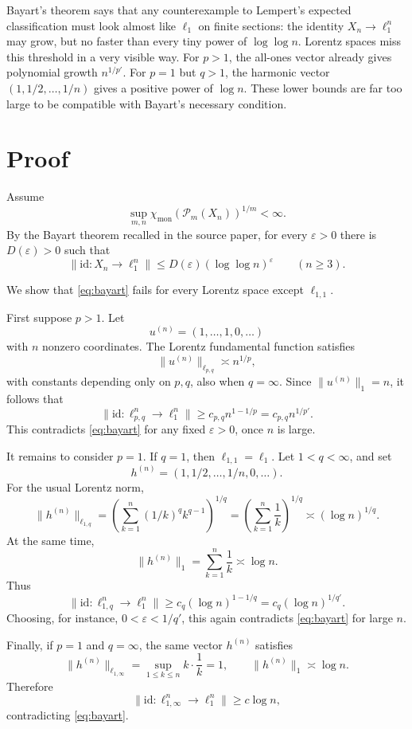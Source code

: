 \documentclass[11pt]{article}
\newcommand{\ellone}{\ell_1}
\newcommand{\chimon}{\chi_{\mathrm{mon}}}
\newcommand{\Pm}{\mathcal P_m}
\newcommand{\id}{\mathrm{id}}
\begin{document}
Bayart's theorem says that any counterexample to Lempert's expected
classification must look almost like \(\ellone\) on finite sections: the
identity \(X_n\to\ell_1^n\) may grow, but no faster than every tiny power of
\(\log\log n\).  Lorentz spaces miss this threshold in a very visible way.
For \(p>1\), the all-ones vector already gives polynomial growth
\(n^{1/p'}\).  For \(p=1\) but \(q>1\), the harmonic vector
\((1,1/2,\ldots,1/n)\) gives a positive power of \(\log n\).  These lower
bounds are far too large to be compatible with Bayart's necessary condition.

\section*{Proof}

Assume
\[
  \sup_{m,n}\chimon(\Pm(X_n))^{1/m}<\infty.
\]
By the Bayart theorem recalled in the source paper, for every
\(\varepsilon>0\) there is \(D(\varepsilon)>0\) such that
\begin{equation}\label{eq:bayart}
  \|\id:X_n\to \ell_1^n\|
  \le D(\varepsilon)(\log\log n)^\varepsilon
  \qquad(n\ge 3).
\end{equation}

We show that \eqref{eq:bayart} fails for every Lorentz space except
\(\ell_{1,1}\).

First suppose \(p>1\).  Let
\[
  u^{(n)}=(1,\ldots,1,0,\ldots)
\]
with \(n\) nonzero coordinates.  The Lorentz fundamental function satisfies
\[
  \|u^{(n)}\|_{\ell_{p,q}}\asymp n^{1/p},
\]
with constants depending only on \(p,q\), also when \(q=\infty\).  Since
\(\|u^{(n)}\|_1=n\), it follows that
\[
  \|\id:\ell_{p,q}^n\to\ell_1^n\|
  \ge c_{p,q} n^{1-1/p}
  = c_{p,q} n^{1/p'}.
\]
This contradicts \eqref{eq:bayart} for any fixed
\(\varepsilon>0\), once \(n\) is large.

It remains to consider \(p=1\).  If \(q=1\), then
\(\ell_{1,1}=\ellone\).  Let \(1<q<\infty\), and set
\[
  h^{(n)}=(1,1/2,\ldots,1/n,0,\ldots).
\]
For the usual Lorentz norm,
\[
  \|h^{(n)}\|_{\ell_{1,q}}
  =
  \left(\sum_{k=1}^n (1/k)^q k^{q-1}\right)^{1/q}
  =
  \left(\sum_{k=1}^n \frac1k\right)^{1/q}
  \asymp (\log n)^{1/q}.
\]
At the same time,
\[
  \|h^{(n)}\|_1=\sum_{k=1}^n\frac1k\asymp \log n.
\]
Thus
\[
  \|\id:\ell_{1,q}^n\to\ell_1^n\|
  \ge c_q(\log n)^{1-1/q}
  =c_q(\log n)^{1/q'}.
\]
Choosing, for instance, \(0<\varepsilon<1/q'\), this again contradicts
\eqref{eq:bayart} for large \(n\).

Finally, if \(p=1\) and \(q=\infty\), the same vector \(h^{(n)}\) satisfies
\[
  \|h^{(n)}\|_{\ell_{1,\infty}}
  =\sup_{1\le k\le n} k\cdot \frac1k=1,
\qquad
  \|h^{(n)}\|_1\asymp \log n.
\]
Therefore
\[
  \|\id:\ell_{1,\infty}^n\to\ell_1^n\|\ge c\log n,
\]
contradicting \eqref{eq:bayart}.
\end{document}
